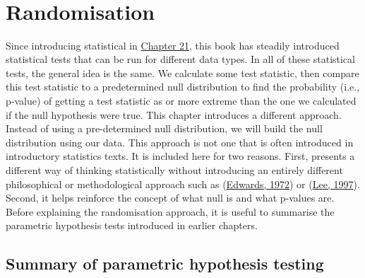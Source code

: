 \documentclass[
  openany]{krantz}
\begin{document}
\begin{verbatim}







\end{verbatim}

\hypertarget{Chapter_35}{%
\chapter{Randomisation}\label{Chapter_35}}

Since introducing statistical  in \protect\hyperlink{Chapter_21}{Chapter 21}, this book has steadily introduced statistical tests that can be run for different data types.
In all of these statistical tests, the general idea is the same.
We calculate some test statistic, then compare this test statistic to a predetermined null distribution to find the probability (i.e., p-value) of getting a test statistic as or more extreme than the one we calculated if the null hypothesis were true.
This chapter introduces a different approach.
Instead of using a pre-determined null distribution, we will build the null distribution using our data.
This approach is not one that is often introduced in introductory statistics texts.
It is included here for two reasons.
First,  presents a different way of thinking statistically without introducing an entirely different philosophical or methodological approach such as  (\protect\hyperlink{ref-Edwards1972}{Edwards, 1972}) or  (\protect\hyperlink{ref-Lee1997}{Lee, 1997}).
Second, it helps reinforce the concept of what null  is and what p-values are.
Before explaining the randomisation approach, it is useful to summarise the parametric hypothesis tests introduced in earlier chapters.

\hypertarget{summary-of-parametric-hypothesis-testing}{%
\section{Summary of parametric hypothesis testing}\label{summary-of-parametric-hypothesis-testing}}
\end{document}
